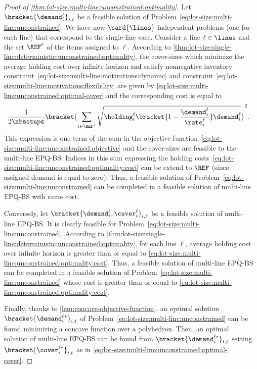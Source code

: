 \begin{proof}[Proof of \cref{thm:lot-size:multi-line:unconstrained:optimality}]
Let $\bracket{\demand_i^{\ell}}_{i,\ell}$ be a feasible solution of Problem~\eqref{eq:lot-size:multi-line:unconstrained}.
We have now $\card{\lines}$ independent problems (one for each line) that correspond to the single-line case.
Consider a line $\ell\in\lines$ and the set $\REF^{\ell}$ of the items assigned to $\ell$.
According to \cref{thm:lot-size:single-line:deterministic:unconstrained:optimality}, the cover-sizes which minimize the average holding cost over infinite horizon and satisfy nonnegative inventory constraint~\eqref{eq:lot-size:multi-line:motivations:dynamic} and constraint~\eqref{eq:lot-size:multi-line:motivations:flexibility} are given by \cref{eq:lot-size:multi-line:unconstrained:optimal-cover} and the corresponding cost is equal to
\begin{equation}\label{eq:lot-size:multi-line:unconstrained:optimality:cost}
  \frac{1}{2\nbsetups}\bracket{\sum_{i\in\REF^{\ell}}\sqrt{\holding_i^{\ell}\bracket{1-\frac{\demand_i^{\ell}}{\rate_i^{\ell}}}\demand_i^{\ell}}}^2.
\end{equation}
This expression is one term of the sum in the objective function~\eqref{eq:lot-size:multi-line:unconstrained:objective} and the cover-sizes are feasible to the multi-line EPQ-BS.
Indices in this sum expressing the holding costs~\eqref{eq:lot-size:multi-line:unconstrained:optimality:cost} can be extend to $\REF$ (since assigned demand is equal to zero).
Thus, a feasible solution of Problem~\eqref{eq:lot-size:multi-line:unconstrained} can be completed in a feasible solution of multi-line EPQ-BS with same cost.


Conversely, let $\bracket{\demand_i^{\ell},\cover_i^{\ell}}_{i,\ell}$ be a feasible solution of multi-line EPQ-BS.
It is clearly feasible for Problem~\eqref{eq:lot-size:multi-line:unconstrained}.
According to \cref{thm:lot-size:single-line:deterministic:unconstrained:optimality}, for each line $\ell$, average holding cost over infinite horizon is greater than or equal to \eqref{eq:lot-size:multi-line:unconstrained:optimality:cost}.
Thus, a feasible solution of multi-line EPQ-BS can be completed in a feasible solution of Problem~\eqref{eq:lot-size:multi-line:unconstrained} whose cost is greater than or equal to \eqref{eq:lot-size:multi-line:unconstrained:optimality:cost}.


Finally, thanks to \cref{lem:concave-objective-function}, an optimal solution $\bracket{\demand_i^{\ell*}}_{i,\ell}$ of Problem~\eqref{eq:lot-size:multi-line:unconstrained} can be found minimizing a concave function over a polyhedron.
Then, an optimal solution of multi-line EPQ-BS can be found from $\bracket{\demand_i^{\ell*}}_{i,\ell}$ setting $\bracket{\cover_i^{\ell*}}_{i,\ell}$ as in \cref{eq:lot-size:multi-line:unconstrained:optimal-cover}.
\end{proof}

